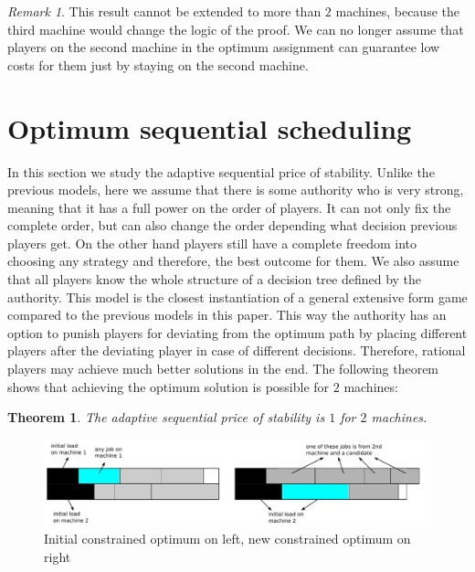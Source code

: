 \documentclass[12pt,a4paper]{article}
\newtheorem{theorem}[lemma]{Theorem}
\theoremstyle{definition}
\theoremstyle{remark}
\newtheorem{remark}[lemma]{Remark}
\begin{document}
\begin{remark} 
This result cannot be extended to more than $2$ machines, because the third machine would change the logic of the proof. We can no longer assume that players on the second machine in the optimum assignment can guarantee low costs for them just by staying on the second machine.
\end{remark}

\section{Optimum sequential scheduling}\label{sec:optimum_sequence}

In this section we study the adaptive sequential price of stability. Unlike the previous models, here we assume that there is some authority who is very strong, meaning that it has a full power on the order of players. It can not only fix the complete order, but can also change the order depending what decision previous players get. On the other hand players still have a complete freedom into choosing any strategy and therefore, the best outcome for them. We also assume that all players know the whole structure of a decision tree defined by the authority. This model is the closest instantiation of a general extensive form game compared to the previous models in this paper. This way the authority has an option to punish players for deviating from the optimum path by placing different players after the deviating player in case of different decisions. Therefore, rational players may achieve much better solutions in the end. The following theorem shows that achieving the optimum solution is possible for $2$ machines:

\begin{theorem}\label{optimum_sequence}
The adaptive sequential price of stability is $1$ for $2$ machines.
\end{theorem}

\begin{figure}
	\centering
	\includegraphics[scale=.65]{find_next_player}
	\caption{Initial constrained optimum on left, new constrained optimum on right}
	\label{fig:next_player}
\end{figure}
\end{document}
